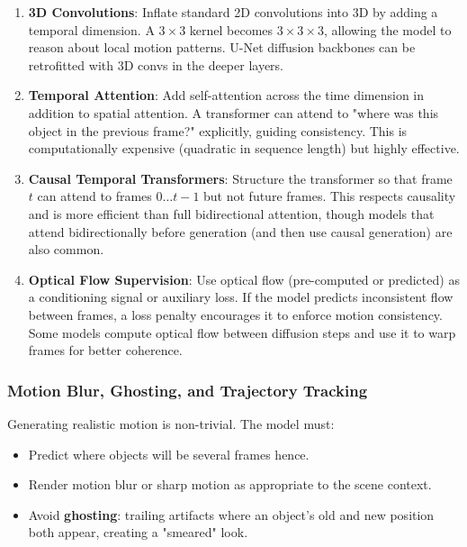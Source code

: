 \begin{enumerate}
  \item \textbf{3D Convolutions}: Inflate standard 2D convolutions into 3D by adding a temporal dimension. A $3 \times 3$ kernel becomes $3 \times 3 \times 3$, allowing the model to reason about local motion patterns. U-Net diffusion backbones can be retrofitted with 3D convs in the deeper layers.

  \item \textbf{Temporal Attention}: Add self-attention across the time dimension in addition to spatial attention. A transformer can attend to "where was this object in the previous frame?" explicitly, guiding consistency. This is computationally expensive (quadratic in sequence length) but highly effective.

  \item \textbf{Causal Temporal Transformers}: Structure the transformer so that frame $t$ can attend to frames $0 \ldots t-1$ but not future frames. This respects causality and is more efficient than full bidirectional attention, though models that attend bidirectionally before generation (and then use causal generation) are also common.

  \item \textbf{Optical Flow Supervision}: Use optical flow (pre-computed or predicted) as a conditioning signal or auxiliary loss. If the model predicts inconsistent flow between frames, a loss penalty encourages it to enforce motion consistency. Some models compute optical flow between diffusion steps and use it to warp frames for better coherence.
\end{enumerate}

\subsubsection{Motion Blur, Ghosting, and Trajectory Tracking}

Generating realistic motion is non-trivial. The model must:
\begin{itemize}
  \item Predict where objects will be several frames hence.
  \item Render motion blur or sharp motion as appropriate to the scene context.
  \item Avoid \textbf{ghosting}: trailing artifacts where an object's old and new position both appear, creating a "smeared" look.
\end{itemize}

